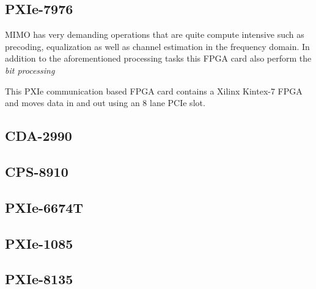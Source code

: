 \subsection{PXIe-7976}\label{ssec:PXIe-7976}
MIMO has very demanding operations that are quite compute intensive such as precoding, equalization as well as channel estimation in the frequency domain. In addition to the aforementioned processing tasks this FPGA card also perform the \emph{bit processing}

This PXIe communication based FPGA card contains a Xilinx Kintex-7 FPGA and moves data in and out using an 8 lane PCIe slot.

\subsection{CDA-2990}\label{ssec:CDA-2990}
\subsection{CPS-8910}\label{ssec:CPS-8910}
\subsection{PXIe-6674T}\label{ssec:PXIe-6674T}
\subsection{PXIe-1085}\label{ssec:PXIe-1085}
\subsection{PXIe-8135}\label{ssec:PXIe-8135}


